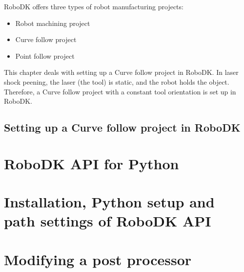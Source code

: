 RoboDK offers three types of robot manufacturing projects:

\begin{itemize}

    \item Robot machining project
    \item Curve follow project 
    \item Point follow project 

\end{itemize}

This chapter deals with setting up a Curve follow project in RoboDK. In laser shock peening, the laser (the tool) is static, and the robot holds the object. Therefore, a Curve follow project with a constant tool orientation is set up in RoboDK.

\subsection{Setting up a Curve follow project in RoboDK}


\section{RoboDK API for Python}

\section{Installation, Python setup and path settings of RoboDK API}

\section{Modifying a post processor}


